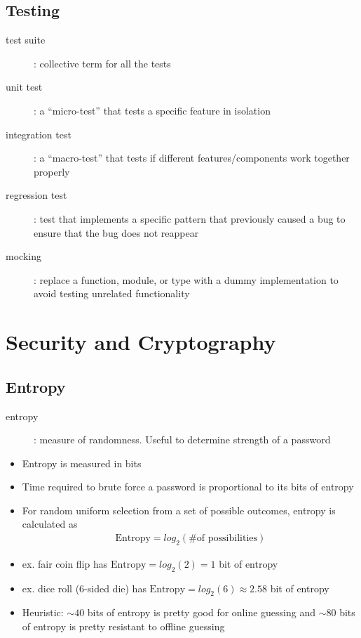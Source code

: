 \documentclass[letterpaper,12pt]{article}
\begin{document}
\subsection{Testing}
\begin{description}
 \item[test suite]: collective term for all the tests
 \item[unit test]: a ``micro-test'' that tests a specific feature in isolation
 \item[integration test]: a ``macro-test'' that tests if different features/components work together properly
 \item[regression test]: test that implements a specific pattern that previously caused a bug to ensure that the bug does not reappear
 \item[mocking]: replace a function, module, or type with a dummy implementation to avoid testing unrelated functionality
\end{description}

\section{Security and Cryptography}

\subsection{Entropy}
\begin{description}
 \item[entropy]: measure of randomness. Useful to determine strength of a password
\end{description}

\begin{itemize}
 \item Entropy is measured in bits
 \item Time required to brute force a password is proportional to its bits of entropy
 \item For random uniform selection from a set of possible outcomes, entropy is calculated as
       \begin{align}
        \text{Entropy} = log_2(\text{\# of possibilities})
       \end{align}
 \item ex. fair coin flip has $\text{Entropy} = log_2(2) = 1$ bit of entropy
 \item ex. dice roll (6-sided die) has $\text{Entropy} = log_2(6) \approx 2.58$ bit of entropy
 \item Heuristic: $\sim 40$ bits of entropy is pretty good for online guessing and $\sim 80$ bits of entropy is pretty resistant to offline guessing
\end{itemize}
\end{document}
